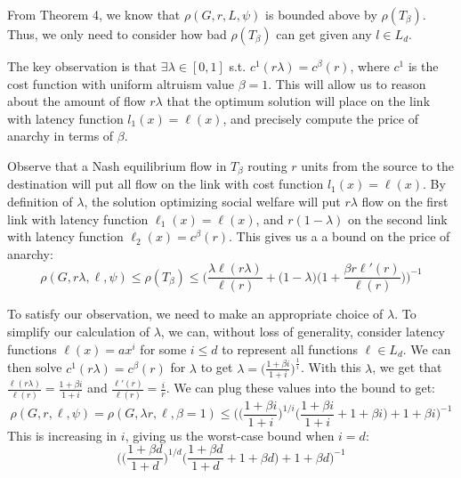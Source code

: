 \begin{proof-sketch}
From Theorem 4, we know that 
$\rho(G,r,{L},\psi)$%
    is bounded above by $\rho(T_\beta)$. Thus, we only need to consider how bad $\rho(T_\beta)$ can get given any $l\in L_d$.

    The key observation is that $\exists\lambda \in [0,1]$ s.t. $c^1(r\lambda) = c^\beta(r)$, where $c^1$ is the cost function with uniform altruism value $\beta=1$. This will allow us to reason about the amount of flow $r\lambda$ that the optimum solution will place on the link with latency function $l_1(x) = \ell(x)$, and precisely compute the price of anarchy in terms of $\beta$.

    Observe that a Nash equilibrium flow in $T_\beta$ routing $r$ units from the source to the destination will put all flow on the link with cost function $l_1(x) = \ell(x)$. By definition of $\lambda$, the solution optimizing social welfare will put $r\lambda$ flow on the first link with latency function $\ell_1(x) = \ell(x)$, and $r(1-\lambda)$ on the second link with latency function $\ell_2(x) = c^\beta(r)$. This gives us a a bound on the price of anarchy:
    $$\rho(G,r\lambda,\ell,\psi) \le \rho(T_\beta) \le \Big(\frac{\lambda \ell(r\lambda)}{\ell(r)} + \Big(1-\lambda\Big)\Big(1+\frac{\beta r\ell'(r)}{\ell(r)}\Big)\Big)^{-1}$$

    To satisfy our observation, we need to make an appropriate choice of $\lambda$. To simplify our calculation of $\lambda$, we can, without loss of generality, consider latency functions $\ell(x) = ax^i$ for some $i \le d$ to represent all functions $\ell \in L_d$. We can then solve $c^1(r\lambda) = c^\beta(r)$ for $\lambda$ to get $\lambda = \Big(\frac{1+\beta i}{1+i}\Big)^{\frac{1}{i}}$.
    With this $\lambda$, we get that $\frac{\ell(r\lambda)}{\ell(r)} = \frac{1+\beta i}{1+i}$ and $\frac{\ell'(r)}{\ell(r)} = \frac{i}{r}$. We can plug these values into the bound to get:
    $$\rho(G,r,\ell,\psi) = \rho(G,\lambda r, \ell,\beta=1) \le \Big(\Big(\frac{1+\beta i}{1+i}\Big)^{1/i}\Big(\frac{1+\beta i}{1+i} + 1 + \beta i\Big)+ 1 + \beta i\Big)^{-1}$$
    This is increasing in $i$, giving us the worst-case bound when $i=d$:
$$\Big(\Big(\frac{1+\beta d}{1+d}\Big)^{1/d}\Big(\frac{1+\beta d}{1+d} + 1 + \beta d\Big)+ 1 + \beta d\Big)^{-1}$$
\end{proof-sketch}

